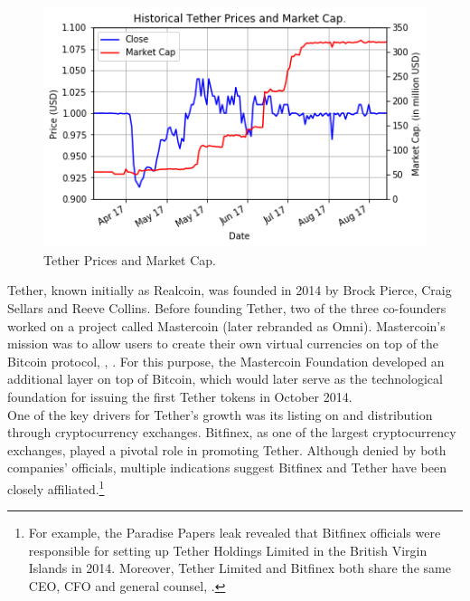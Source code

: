 \documentclass[conference]{IEEEtran}
\begin{document}
\begin{figure}[htbp]
	\centerline{
		\includegraphics[width=\linewidth]{assets/tetherPrices.png}
		}
	\caption{Tether Prices and Market Cap.}
	\label{fig:tether}
\end{figure}

Tether, known initially as Realcoin, was founded in 2014 by Brock Pierce, Craig Sellars and Reeve Collins. Before founding Tether, two of the three co-founders worked on a project called Mastercoin (later rebranded as Omni). Mastercoin's mission was to allow users to create their own virtual currencies on top of the Bitcoin protocol, \cite{Zynis}\cite{Sellars}, \cite{Roth}. For this purpose, the Mastercoin Foundation developed an additional layer on top of Bitcoin, which would later serve as the technological foundation for issuing the first Tether tokens in October 2014.\\

One of the key drivers for Tether's growth was its listing on and distribution through cryptocurrency exchanges. Bitfinex, as one of the largest cryptocurrency exchanges, played a pivotal role in promoting Tether. Although denied by both companies' officials, multiple indications suggest Bitfinex and Tether have been closely affiliated.\footnote{For example, the Paradise Papers leak revealed that Bitfinex officials were responsible for setting up Tether Holdings Limited in the British Virgin Islands in 2014. Moreover, Tether Limited and Bitfinex both share the same CEO, CFO and general counsel, \cite{Tether2}\cite{Bitfinex}.}\\
\end{document}
